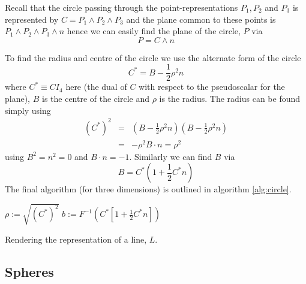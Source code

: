 Recall that the circle passing through the point-representations $P_1, P_2$ and $P_3$
is represented by $C = P_1 \wedge P_2 \wedge P_3$ and the plane common to these points is
$P_1 \wedge P_2 \wedge P_3 \wedge n$ hence we can easily find the plane of 
the circle, $P$ via
\[
P = C \wedge n
\]

To find the radius and centre of the circle we use the alternate form of the 
circle
\cite{wareham_lasenby}
\[
C^* = B - \frac{1}{2}\rho^2n
\]
where $C^* \equiv CI_4$ here (the dual of $C$ with respect to the pseudoscalar 
for the plane), $B$ is the centre of the circle and $\rho$ is the radius. The
radius can be found simply using
\begin{eqnarray*}
(C^*)^2 & = & \left(B - \frac{1}{2}\rho^2n\right)\left(B - \frac{1}{2}\rho^2n\right) \\
        & = & -\rho^2 B\cdot n = \rho^2
\end{eqnarray*}
using $B^2 = n^2 = 0$ and $B \cdot n = -1$. Similarly we can find $B$ via
\[
B = C^* \left( 1 + \frac{1}{2}C^*n \right)
\]
The final algorithm (for three dimensions) is outlined in algorithm \ref{alg:circle}.


\begin{fancyalg}
\begin{algorithmic}[1]
\STATE $\rho := \sqrt{(C^*)^2}$
\STATE $b := F^{-1}\left(C^* \left[ 1 + \frac{1}{2}C^*n \right]\right)$
\end{algorithmic}
\caption{\label{alg:line}Rendering the representation of a line, $L$.}
\end{fancyalg}


\subsection{Spheres}
